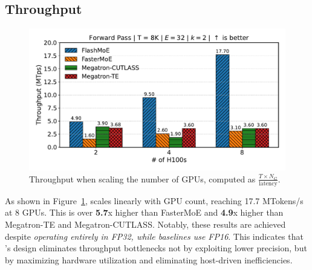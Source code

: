 \subsection{Throughput}\label{subsec:throughput}
\begin{figure}
    \vspace{-15pt}
    \centering
    \includegraphics[width=0.9\linewidth, keepaspectratio]{flash_figs/throughput_8}
    \caption{Throughput when scaling the number of GPUs, computed as $\frac{T \times N_G}{\text{latency}}$.}
    \label{fig:thr}
\end{figure}
As shown in Figure~\ref{fig:thr}, \sysname scales linearly with GPU count, reaching 17.7 MTokens/s at 8 GPUs.
This is over \textbf{5.7}x higher than FasterMoE and \textbf{4.9}x higher than Megatron-TE and Megatron-CUTLASS\@.
Notably, these results are achieved despite \emph{\sysname operating entirely in FP32,
    while baselines use FP16}.
This indicates that \sysname’s design eliminates throughput bottlenecks not by
exploiting lower precision, but by maximizing hardware utilization and eliminating host-driven inefficiencies.
